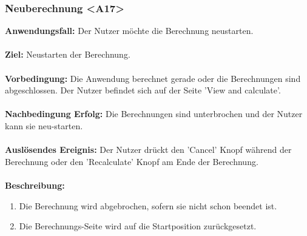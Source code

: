 \documentclass[parskip=full]{scrartcl} %
\begin{document}
\subsubsection*{Neuberechnung <A17>}
\textbf{Anwendungsfall:}  Der Nutzer möchte die Berechnung neustarten.\\\\
\textbf{Ziel:} Neustarten der Berechnung.\\\\
\textbf{Vorbedingung:} Die Anwendung berechnet gerade oder die Berechnungen sind abgeschlossen. Der Nutzer befindet sich auf der Seite 'View and calculate'.\\\\
\textbf{Nachbedingung Erfolg:} Die Berechnungen sind unterbrochen und der Nutzer kann sie neu-starten.\\\\
\textbf{Auslösendes Ereignis:} Der Nutzer drückt den 'Cancel' Knopf während der Berechnung oder den 'Recalculate' Knopf am Ende der Berechnung.\\\\
\textbf{Beschreibung:}
\begin{enumerate}
    \item Die Berechnung wird abgebrochen, sofern sie nicht schon beendet ist.
    \item Die Berechnungs-Seite wird auf die Startposition zurückgesetzt.
\end{enumerate}
\newpage
\end{document}
